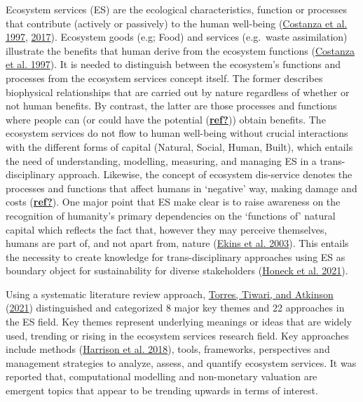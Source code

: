 \documentclass[
  14pt,
]{extarticle}
\begin{document}
Ecosystem services (ES) are the ecological characteristics, function or processes that contribute (actively or passively) to the human well-being (\protect\hyperlink{ref-Costanza1997}{Costanza et al. 1997}, \protect\hyperlink{ref-Costanza2017}{2017}). Ecosystem goods (e.g; Food) and services (e.g.~waste assimilation) illustrate the benefits that human derive from the ecosystem functions (\protect\hyperlink{ref-Costanza1997}{Costanza et al. 1997}).
It is needed to distinguish between the ecosystem's functions and processes from the ecosystem services concept itself. The former describes biophysical relationships that are carried out by nature regardless of whether or not human benefits.
By contrast, the latter are those processes and functions where people can (or could have the potential (\protect\hyperlink{ref-ref}{\textbf{ref?}})) obtain benefits. The ecosystem services do not flow to human well-being without crucial interactions with the different forms of capital (Natural, Social, Human, Built), which entails the need of understanding, modelling, measuring, and managing ES in a trans-disciplinary approach. Likewise, the concept of ecosystem dis-service denotes the processes and functions that affect humans in `negative' way, making damage and costs (\protect\hyperlink{ref-ref}{\textbf{ref?}}).
One major point that ES make clear is to raise awareness on the recognition of humanity's primary dependencies on the `functions of' natural capital which reflects the fact that, however they may perceive themselves, humans are part of, and not apart from, nature (\protect\hyperlink{ref-Ekins2003}{Ekins et al. 2003}). This entails the necessity to create knowledge for trans-disciplinary approaches using ES as boundary object for sustainability for diverse stakeholders (\protect\hyperlink{ref-Honeck2021}{Honeck et al. 2021}).

Using a systematic literature review approach, \protect\hyperlink{ref-Torres2021}{Torres, Tiwari, and Atkinson} (\protect\hyperlink{ref-Torres2021}{2021}) distinguished and categorized 8 major key themes and 22 approaches in the ES field. Key themes represent underlying meanings or ideas that are widely used, trending or rising in the ecosystem services research field.
Key approaches include methods (\protect\hyperlink{ref-Harrison2018}{Harrison et al. 2018}), tools, frameworks, perspectives and management strategies to analyze, assess, and quantify ecosystem services.
It was reported that, computational modelling and non-monetary valuation are emergent topics that appear to be trending upwards in terms of interest.
\end{document}
